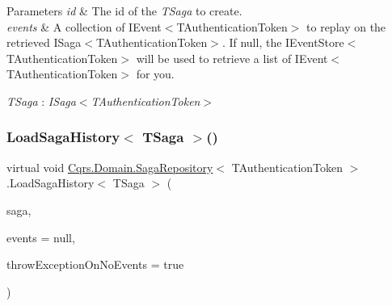 \begin{DoxyParams}{Parameters}
{\em id} & The id of the {\itshape T\+Saga}  to create.\\
\hline
{\em events} & A collection of I\+Event$<$\+T\+Authentication\+Token$>$ to replay on the retrieved I\+Saga$<$\+T\+Authentication\+Token$>$. If null, the I\+Event\+Store$<$\+T\+Authentication\+Token$>$ will be used to retrieve a list of I\+Event$<$\+T\+Authentication\+Token$>$ for you. \\
\hline
\end{DoxyParams}
\begin{Desc}
\item[Type Constraints]\begin{description}
\item[{\em T\+Saga} : {\em I\+Saga$<$T\+Authentication\+Token$>$}]\end{description}
\end{Desc}
\mbox{\label{classCqrs_1_1Domain_1_1SagaRepository_af6af9066681e47bc4ff2e14358321fb8_af6af9066681e47bc4ff2e14358321fb8}} 
\subsubsection{\texorpdfstring{Load\+Saga\+History$<$ T\+Saga $>$()}{LoadSagaHistory< TSaga >()}}
{\footnotesize\ttfamily virtual void \hyperlink{classCqrs_1_1Domain_1_1SagaRepository}{Cqrs.\+Domain.\+Saga\+Repository}$<$ T\+Authentication\+Token $>$.Load\+Saga\+History$<$ T\+Saga $>$ (\begin{DoxyParamCaption}\item[{T\+Saga}]{saga,  }\item[{I\+List$<$ \hyperlink{interfaceCqrs_1_1Events_1_1ISagaEvent}{I\+Saga\+Event}$<$ T\+Authentication\+Token $>$$>$}]{events = {\ttfamily null},  }\item[{bool}]{throw\+Exception\+On\+No\+Events = {\ttfamily true} }\end{DoxyParamCaption})\hspace{0.3cm}{\ttfamily [virtual]}}



